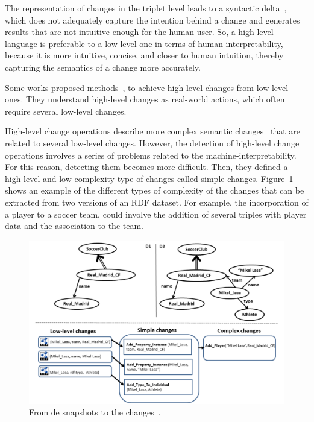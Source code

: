 \documentclass[sw]{iosart2x}
\begin{document}
The representation of changes in the triplet level leads to a syntactic delta~\cite{ZeginisTC11}, which does not adequately capture the intention behind a change and generates results that are not intuitive enough for the human user. So, a high-level language is preferable to a low-level one in terms of human interpretability, because it is more intuitive, concise, and closer to human intuition, thereby capturing the semantics of a change more accurately.

Some works proposed methods~\cite{PapavasileiouFFKC13}, \cite{RoussakisCSFS15} to achieve high-level changes from low-level ones. They understand high-level changes as real-world actions, which often require several low-level changes.

High-level change operations describe more complex semantic changes~\cite{RoussakisCSFS15} that are related to several low-level changes. However, the detection of high-level change operations involves a series of problems related to the machine-interpretability. For this reason, detecting them becomes more difficult. Then, they defined a high-level and low-complexity type of changes called simple changes. Figure~\ref{fig:cd} shows an example of the different types of complexity of the changes that can be extracted from two versions of an RDF dataset. For example, the incorporation of a player to a soccer team, could involve the addition of several triples with player data and the association to the team.

\begin{figure}[h]
	\centering
	\includegraphics[scale=0.3]{img/cd.png}
	\caption{From de snapshots to the changes~\cite{RoussakisCSFS15}.}
	\label{fig:cd}
\end{figure}
\end{document}
